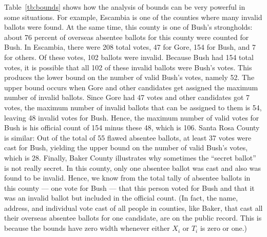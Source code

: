 \documentclass[11pt,titlepage]{article}
\begin{document}
Table~\ref{tb:bounds} shows how the analysis of bounds can be very
powerful in some situations. For example, Escambia is one of the
counties where many invalid ballots were found. At the same time, this
county is one of Bush's strongholds: about 76 percent of overseas
absentee ballots for this county were counted for Bush. In Escambia,
there were 208 total votes, 47 for Gore, 154 for Bush, and 7 for
others. Of these votes, 102 ballots were invalid. Because Bush had 154
total votes, it is possible that all 102 of these invalid ballots were
Bush's votes. This produces the lower bound on the number of valid
Bush's votes, namely 52.  The upper bound occurs when Gore and other
candidates get assigned the maximum number of invalid ballots. Since
Gore had 47 votes and other candidates got 7 votes, the maximum number
of invalid ballots that can be assigned to them is 54, leaving 48
invalid votes for Bush. Hence, the maximum number of valid votes for
Bush is his official count of 154 minus these 48, which is 106.
Santa Rosa County is similar: Out of the total of 55 flawed absentee
ballots, at least 37 votes were cast for Bush, yielding the upper
bound on the number of valid Bush's votes, which is 28.  Finally,
Baker County illustrates why sometimes the ``secret ballot'' is not
really secret.  In this county, only one absentee ballot was cast and
also was found to be invalid. Hence, we know from the total tally of
absentee ballots in this county --- one vote for Bush --- that this
person voted for Bush and that it was an invalid ballot but included
in the official count.  (In fact, the name, address, and individual
vote cast of all people in counties, like Baker, that cast all their
overseas absentee ballots for one candidate, are on the public record.
This is because the bounds have zero width whenever either $X_i$ or
$T_i$ is zero or one.)
\end{document}
